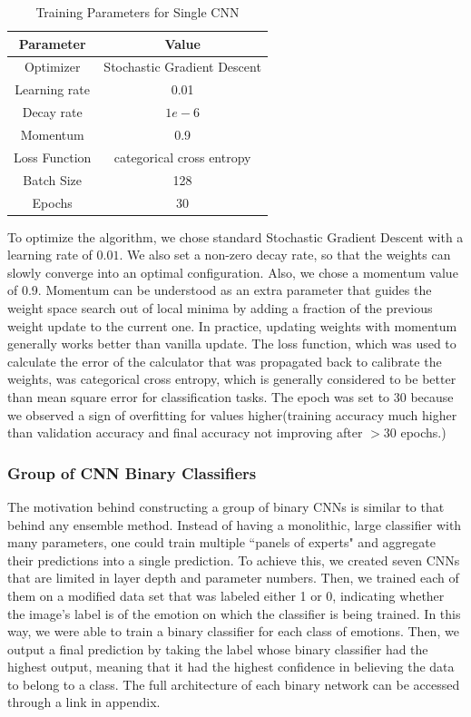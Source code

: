 \documentclass[11pt]{article}
\begin{document}
    \begin{table}[!htbp]
\centering
\caption{Training Parameters for Single CNN}
\label{my-label0}
\begin{tabular}{|c|c|}
\hline
Parameter     & Value \\ \hline
Optimizer       &  Stochastic Gradient Descent     \\ \hline
Learning rate &   0.01    \\ \hline
Decay rate    &  $1e-6$     \\ \hline
Momentum      &   0.9    \\ \hline
Loss Function &  categorical cross entropy     \\ \hline
Batch Size    &  128     \\ \hline
Epochs        &  30     \\ \hline
\end{tabular}
\end{table}
To optimize the algorithm, we chose standard Stochastic Gradient Descent with a learning rate of $0.01$. We also set a non-zero decay rate, so that the weights can slowly converge into an optimal configuration. Also, we chose a momentum value of 0.9. Momentum can be understood as an extra parameter that guides the weight space search out of local minima by adding a fraction of the previous weight update to the current one. In practice, updating weights with momentum generally works better than vanilla update. The loss function, which was used to calculate the error of the calculator that was propagated back to calibrate the weights, was categorical cross entropy, which is generally considered to be better than mean square error for classification tasks. The epoch was set to 30 because we observed a sign of overfitting for values higher(training accuracy much higher than validation accuracy and final accuracy not improving after $>30$ epochs.)

	\subsubsection{Group of CNN Binary Classifiers}
The motivation behind constructing a group of binary CNNs is similar to that behind any ensemble method. Instead of having a monolithic, large classifier with many parameters, one could train multiple ``panels of experts" and aggregate their predictions into a single prediction. To achieve this, we created seven CNNs that are limited in layer depth and parameter numbers. Then, we trained each of them on a modified data set that was labeled either 1 or 0, indicating whether the image's label is of the emotion on which the classifier is being trained. In this way, we were able to train a binary classifier for each class of emotions. Then, we output a final prediction by taking the label whose binary classifier had the highest output, meaning that it had the highest confidence in believing the data to belong to a class. The full architecture of each binary network can be accessed through a link in appendix.
    
\end{document}
